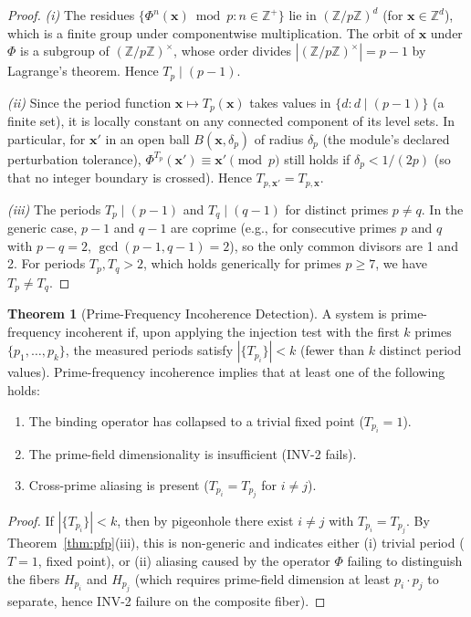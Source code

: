 \documentclass[12pt,letterpaper]{article}
\theoremstyle{definition}
\newtheorem{theorem}{Theorem}[section]
\theoremstyle{remark}
\begin{document}
\begin{proof}
\textit{(i)} The residues $\{\Phi^n(\mathbf{x}) \bmod p : n \in \mathbb{Z}^+\}$ lie in
$(\mathbb{Z}/p\mathbb{Z})^d$ (for $\mathbf{x} \in \mathbb{Z}^d$), which is a finite
group under componentwise multiplication. The orbit of $\mathbf{x}$ under $\Phi$
is a subgroup of $(\mathbb{Z}/p\mathbb{Z})^\times$, whose order divides
$|(\mathbb{Z}/p\mathbb{Z})^\times| = p - 1$ by Lagrange's theorem.
Hence $T_p \mid (p-1)$.

\textit{(ii)} Since the period function $\mathbf{x} \mapsto T_p(\mathbf{x})$
takes values in $\{d : d \mid (p-1)\}$ (a finite set), it is locally constant
on any connected component of its level sets. In particular, for $\mathbf{x}'$
in an open ball $B(\mathbf{x}, \delta_p)$ of radius $\delta_p$ (the module's
declared perturbation tolerance), $\Phi^{T_p}(\mathbf{x}') \equiv \mathbf{x}' \pmod p$
still holds if $\delta_p < 1/(2p)$ (so that no integer boundary is crossed).
Hence $T_{p,\mathbf{x}'} = T_{p,\mathbf{x}}$.

\textit{(iii)} The periods $T_p \mid (p-1)$ and $T_q \mid (q-1)$ for distinct
primes $p \neq q$. In the generic case, $p-1$ and $q-1$ are coprime
(e.g., for consecutive primes $p$ and $q$ with $p-q=2$, $\gcd(p-1,q-1)=2$),
so the only common divisors are 1 and 2. For periods $T_p, T_q > 2$,
which holds generically for primes $p \geq 7$, we have $T_p \neq T_q$.
\end{proof}

\begin{theorem}[Prime-Frequency Incoherence Detection]
\label{thm:incoherence}
A system is prime-frequency incoherent if, upon applying the injection test
with the first $k$ primes $\{p_1, \ldots, p_k\}$, the measured periods
satisfy $|\{T_{p_i}\}| < k$ (fewer than $k$ distinct period values).
Prime-frequency incoherence implies that at least one of the following holds:
\begin{enumerate}[label=(\roman*),noitemsep]
  \item The binding operator has collapsed to a trivial fixed point ($T_{p_i} = 1$).
  \item The prime-field dimensionality is insufficient (INV-2 fails).
  \item Cross-prime aliasing is present ($T_{p_i} = T_{p_j}$ for $i \neq j$).
\end{enumerate}
\end{theorem}

\begin{proof}
If $|\{T_{p_i}\}| < k$, then by pigeonhole there exist $i \neq j$ with
$T_{p_i} = T_{p_j}$. By Theorem~\ref{thm:pfp}(iii), this is non-generic and
indicates either (i) trivial period ($T = 1$, fixed point), or (ii) aliasing
caused by the operator $\Phi$ failing to distinguish the fibers $H_{p_i}$ and
$H_{p_j}$ (which requires prime-field dimension at least $p_i \cdot p_j$ to
separate, hence INV-2 failure on the composite fiber).
\end{proof}
\end{document}
